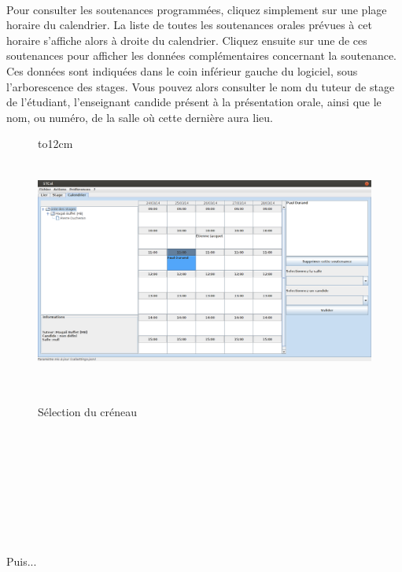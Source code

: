 \documentclass[a4paper,10pt]{report}
\begin{document}
      \paragraph{}
	Pour consulter les soutenances programmées, cliquez simplement sur une plage horaire du calendrier.
	La liste de toutes les soutenances orales prévues à cet horaire s'affiche alors à droite du calendrier.
	Cliquez ensuite sur une de ces soutenances pour afficher les données complémentaires concernant la soutenance.
	Ces données sont indiquées dans le coin inférieur gauche du logiciel, sous l'arborescence des stages.
	Vous pouvez alors consulter le nom du tuteur de stage de l'étudiant, l'enseignant candide présent à la présentation orale, ainsi que le nom, ou numéro, de la salle où cette dernière aura lieu.
	~\\
	 \begin{figure}[H]
	    \hbox to12cm{\hss\includegraphics[height=8cm,width=18cm]{../general/creneau.png}\hss}
	    \caption{Sélection du créneau}
	 \end{figure}
      ~\\~\\~\\~\\~\\~\\~\\
      \paragraph{}
      Puis...
      
\end{document}
